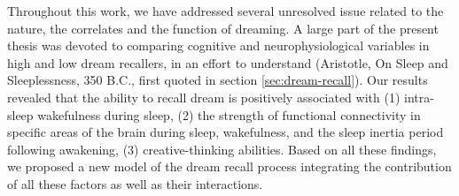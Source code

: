 Throughout this work, we have addressed several unresolved issue related to the nature, the correlates and the function of dreaming. A large part of the present thesis was devoted to comparing cognitive and neurophysiological variables in high and low dream recallers, in an effort to understand  (Aristotle, On Sleep and Sleeplessness, 350 B.C., first quoted in section \ref{sec:dream-recall}). Our results revealed that the ability to recall dream is positively associated with (1) intra-sleep wakefulness during sleep, (2) the strength of functional connectivity in specific areas of the brain during sleep, wakefulness, and the sleep inertia period following awakening, (3) creative-thinking abilities. Based on all these findings, we proposed a new model of the dream recall process integrating the contribution of all these factors as well as their interactions.
